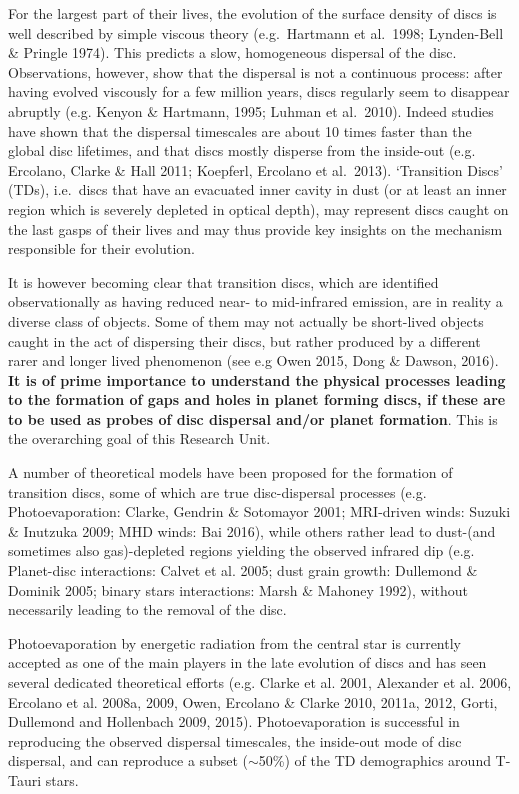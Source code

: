 \documentclass[12pt]{article}
\begin{document}
For the largest part
of their lives, the evolution of the surface density of discs is well
described by simple viscous theory (e.g.\ Hartmann et al.\ 1998; Lynden-Bell
\& Pringle 1974). This predicts a slow, homogeneous dispersal of the
disc. Observations, however, show that the dispersal is not a
continuous process: after having evolved viscously for a few million
years, discs regularly seem to disappear abruptly  (e.g. Kenyon \& Hartmann, 1995; Luhman
et al.\ 2010). Indeed studies have shown that the dispersal
timescales are about 10 times faster than the global disc lifetimes, and
that discs mostly disperse from the inside-out (e.g. Ercolano, Clarke \&
Hall 2011; Koepferl, Ercolano et al.\ 2013). `Transition Discs' (TDs), i.e.\ discs
that have an evacuated inner cavity in dust (or at least an inner region
which is severely depleted in optical depth), may represent discs caught on
the last gasps of their lives and may thus provide key insights on the
mechanism responsible for their evolution. 

It is however becoming clear that transition discs, which are
identified observationally as having reduced near- to mid-infrared
emission,  are in reality a diverse class of objects. Some of them may
not actually be short-lived objects caught in the act of dispersing
their discs, but rather produced by a different rarer and longer lived
phenomenon (see e.g Owen 2015, Dong \& Dawson, 2016). {\bf  It is of prime
importance to understand the physical processes leading to the
formation of gaps and holes in planet forming discs, if these are to
be used as probes of disc dispersal and/or  planet formation}. This is
the overarching goal of this Research Unit. 

A number of theoretical models have been proposed for the formation of
transition discs, some of which are true disc-dispersal processes
(e.g. Photoevaporation: Clarke, Gendrin \& Sotomayor 2001; MRI-driven
winds: Suzuki \& Inutzuka 2009; MHD winds: Bai 2016), while others
rather lead to dust-(and sometimes also gas)-depleted regions yielding
the observed infrared dip (e.g. Planet-disc interactions: Calvet et
al. 2005; dust grain growth: Dullemond \& Dominik 2005; binary stars
interactions: Marsh \& Mahoney 1992), without necessarily leading to
the removal of the disc.  

Photoevaporation by energetic radiation from the central star is currently accepted as one of
the main players in the late evolution of discs and has seen several
dedicated theoretical efforts (e.g. Clarke et al. 2001, Alexander et
al. 2006, Ercolano et al. 2008a, 2009, Owen, Ercolano \& Clarke 2010, 2011a,
2012, Gorti, Dullemond and Hollenbach 2009, 2015). Photoevaporation is
successful in reproducing the observed dispersal timescales, the
inside-out mode of disc dispersal, and can reproduce a subset
($\sim$50\%) of the TD demographics around T-Tauri stars.
\end{document}
